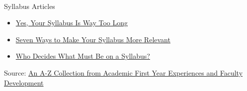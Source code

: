 \documentclass[
  letterpaper,
  DIV=11,
  numbers=noendperiod]{scrartcl}
\makeatletter
\let\oldparagraph\paragraph
\renewcommand{\paragraph}{
    \@ifstar
      \xxxParagraphStar
      \xxxParagraphNoStar
  }
\newcommand{\xxxParagraphStar}[1]{\oldparagraph*{#1}\mbox{}}
\newcommand{\xxxParagraphNoStar}[1]{\oldparagraph{#1}\mbox{}}
\providecommand{\tightlist}{%
  \setlength{\itemsep}{0pt}\setlength{\parskip}{0pt}}\usepackage{longtable,booktabs,array}
\makeatother
\begin{document}
\paragraph{Syllabus Articles}\label{syllabus-articles}

\begin{itemize}
\tightlist
\item
  \href{https://www.chronicle.com}{Yes, Your Syllabus Is Way Too Long}
\item
  \href{https://www.facultyfocus.com}{Seven Ways to Make Your Syllabus
  More Relevant}
\item
  \href{https://www.insidehighered.com}{Who Decides What Must Be on a
  Syllabus?}
\end{itemize}

Source:
\href{https://w2.csun.edu/educational-policies-committee/resources/syllabus-best-practices}{An
A-Z Collection from Academic First Year Experiences and Faculty
Development}
\end{document}
